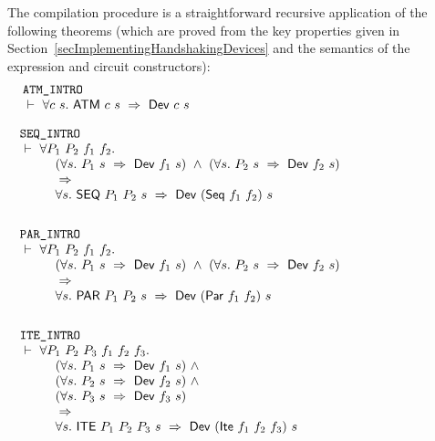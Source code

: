 \documentclass{llncs}
\begin{document}
\noindent The compilation procedure is a straightforward recursive application of the
following theorems (which are proved from the key properties given in 
Section~\ref{secImplementingHandshakingDevices}
and the semantics of the expression and circuit constructors):
$$\begin{array}{l}
\texttt{ATM\_INTRO}\\
~\vdash\ \forall c~s.~\mathsf{ATM}\ c\ s\  \Rightarrow \  \mathsf{Dev}\ c\ s\\
\phantom{~~~~~~~~~~~~~~~~~~~~~~~~~~~~~~~~~~~~~~~~~~~~~~~~~~~~~~~~~~~~~~~~~~~~~~~~~~~~~~~~~~~~~~~~~~~~~~~~~~~~~}\\[-3mm]
\end{array}$$
\vspace*{-3mm}
$$\begin{array}{l}
\texttt{SEQ\_INTRO}\\
~\TURNST\ \forall P_1~P_2~f_1~f_2.\\
\phantom{~~\TURNST\ \forall~}
(\forall s.~P_1~s \ \IMP\ \DEF{Dev}~f_1~s)~\AND~(\forall s.~P_2~s \ \IMP\ \DEF{Dev}~f_2~s)\\
\phantom{~~\TURNST\ \forall~}
 \IMP\\
\phantom{~~\TURNST\ \forall~}
\forall s.~\DEF{SEQ}\ P_1\ P_2\ s \ \IMP \ \DEF{Dev}\ (\DEF{Seq}~f_1~f_2)\ s\\
\phantom{~~~~~~~~~~~~~~~~~~~~~~~~~~~~~~~~~~~~~~~~~~~~~~~~~~~~~~~~~~~~~~~~~~~~~~~~~~~~~~~~~~~~~~~~~~~~~~~~~~~~~~}
\end{array}$$
\vspace*{-3mm}
$$\begin{array}{l}
\texttt{PAR\_INTRO}\\
~\TURNST\ \forall P_1~P_2~f_1~f_2.\\
\phantom{~~\TURNST\ \forall~}
(\forall s.~P_1~s \ \IMP\ \DEF{Dev}~f_1~s)~\AND~(\forall s.~P_2~s \ \IMP\ \DEF{Dev}~f_2~s)\\
\phantom{~~\TURNST\ \forall~}
\IMP\\
\phantom{~~\TURNST\ \forall~}
\forall s.~ \DEF{PAR}\ P_1\ P_2\ s\ \IMP \ \DEF{Dev}\ (\DEF{Par}~f_1~f_2)\ s \\
\phantom{~~~~~~~~~~~~~~~~~~~~~~~~~~~~~~~~~~~~~~~~~~~~~~~~~~~~~~~~~~~~~~~~~~~~~~~~~~~~~~~~~~~~~~~~~~~~~~~~~~~~~~}
\end{array}$$
\vspace*{-3mm}
$$\begin{array}{l}
\texttt{ITE\_INTRO}\\
~\TURNST\ \forall P_1~P_2~P_3~f_1~f_2~f_3.\\
\phantom{~~\TURNST\ \forall~}
(\forall s.~P_1~s \ \IMP\ \DEF{Dev}~f_1~s)~\AND\\
\phantom{~~\TURNST\ \forall~}
(\forall s.~P_2~s \ \IMP\ \DEF{Dev}~f_2~s)~\AND\\
\phantom{~~\TURNST\ \forall~}
(\forall s.~P_3~s \ \IMP\ \DEF{Dev}~f_3~s)\\
\phantom{~~\TURNST\ \forall~}
\IMP\\
\phantom{~~\TURNST\ \forall~}
\forall s.~ \DEF{ITE}\ P_1\ P_2\ P_3\ s\ 
 \IMP \ \DEF{Dev}\ (\DEF{Ite}~f_1~f_2~f_3)\ s\\
\phantom{~~~~~~~~~~~~~~~~~~~~~~~~~~~~~~~~~~~~~~~~~~~~~~~~~~~~~~~~~~~~~~~~~~~~~~~~~~~~~~~~~~~~~~~~~~~~~~~~~~~~~~}
\end{array}$$
\end{document}
